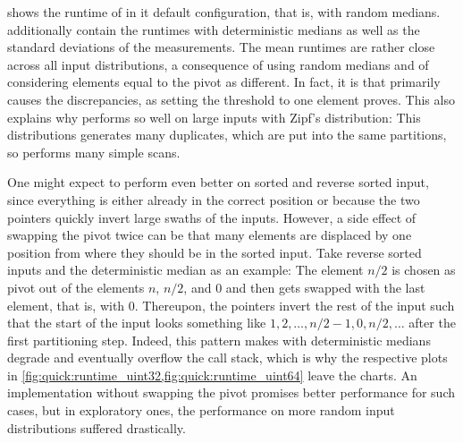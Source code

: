  shows the runtime of \QS{} in it default configuration, that is, with random medians.
 additionally contain the runtimes with deterministic medians as well as the standard deviations of the measurements.
The mean runtimes are rather close across all input distributions, a consequence of using random medians and of considering elements equal to the pivot as different.
In fact, it is \IS{} that primarily causes the discrepancies, as setting the threshold to one element proves.
This also explains why \QS{} performs so well on large inputs with Zipf's distribution:
This distributions generates many duplicates, which are put into the same partitions, so \IS{} performs many simple scans.

One might expect \QS{} to perform even better on sorted and reverse sorted input, since everything is either already in the correct position or because the two pointers quickly invert large swaths of the inputs.
However, a side effect of swapping the pivot twice can be that many elements are displaced by one position from where they should be in the sorted input.
Take reverse sorted inputs and the deterministic median as an example:
The element \(n/2\) is chosen as pivot out of the elements \(n\), \(n/2\), and \(0\) and then gets swapped with the last element, that is, with \(0\).
Thereupon, the pointers invert the rest of the input such that the start of the input looks something like \(1, 2, \dots, n/2-1, 0, n/2, \dots\) after the first partitioning step.
Indeed, this pattern makes \QS{} with deterministic medians degrade and eventually overflow the call stack, which is why the respective plots in \cref{fig:quick:runtime_uint32,fig:quick:runtime_uint64} leave the charts.
An implementation without swapping the pivot promises better performance for such cases, but in exploratory ones, the performance on more random input distributions suffered drastically.

